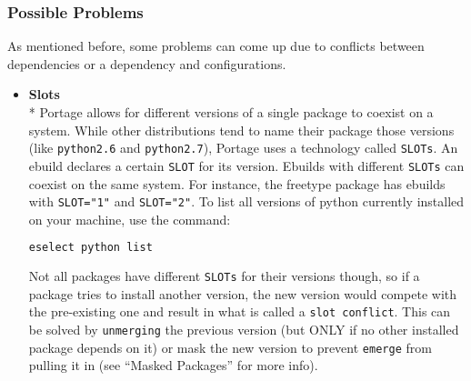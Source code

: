 \documentclass[11pt]{article}
\begin{document}
   \subsubsection*{Possible Problems}
   As mentioned before, some problems can come up due to conflicts between dependencies or a dependency and configurations.
    \begin{itemize}
      \item \textbf{Slots}
       \\* Portage allows for different versions of a single package to coexist on a system. While other distributions tend to name their package those versions (like \verb|python2.6| and \verb|python2.7|), Portage uses a technology called \verb|SLOTs|. An ebuild declares a certain \verb|SLOT| for its version. Ebuilds with different \verb|SLOTs| can coexist on the same system. For instance, the freetype package has ebuilds with \verb|SLOT="1"| and \verb|SLOT="2"|. To list all versions of python currently installed on your machine, use the command:
       \begin{lstlisting}[basicstyle=\ttfamily, backgroundcolor = \color{lightgray}, language = bash, xleftmargin = 0cm, framexleftmargin = 1em, framexrightmargin = 1em, showstringspaces=false]
eselect python list
\end{lstlisting}
       Not all packages have different \verb|SLOTs| for their versions though, so if a package tries to install another version, the new version would compete with the pre-existing one and result in what is called a \verb|slot conflict|. This can be solved by \verb|unmerging| the previous version (but ONLY if no other installed package depends on it) or mask the new version to prevent \verb|emerge| from pulling it in (see ``Masked Packages'' for more info).
       

\end{itemize}
\end{document}

